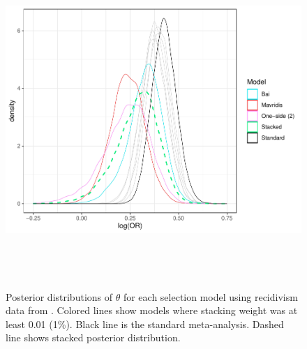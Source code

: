 \documentclass[12pt]{article}   	%
\numberwithin{equation}{section}
\begin{document}
\begin{figure}
\includegraphics[height = 5in, width = 6.5in]{landenberger_post.pdf}
\caption{Posterior distributions of $\theta$ for each selection model using recidivism data from \citet{landenberger2005recidivism}. Colored lines show models where stacking weight was at least 0.01 (1\%). 
Black line is the standard meta-analysis.
Dashed line shows stacked posterior distribution.}
\label{fig:landenberger}
\end{figure}



\end{document}
